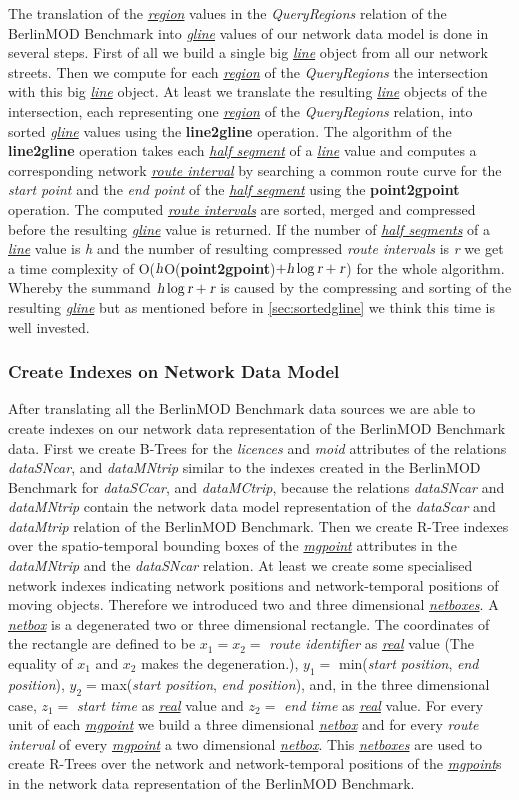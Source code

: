 \documentclass[a4paper]{article}
\newcommand{\bmodb} {BerlinMOD Benchmark}
\newcommand{\op}[1]{\textbf{#1}}
\newcommand{\var}[1]{\textsl{#1}}
\newcommand{\dt}[1]{\textsl{\underline{#1}}}
\begin{document}
{The translation of the \dt{region} values in the \var{QueryRegions} relation of the \bmodb{} into \dt{gline} values of our network data model is done in several steps. First of all we build a single big \dt{line} object from all our network streets. Then we compute for each \dt{region} of the \var{QueryRegions} the intersection with this big \dt{line} object. At least we translate the resulting \dt{line} objects of the intersection, each representing one \dt{region} of the \var{QueryRegions} relation, into sorted \dt{gline} values using the \op{line2gline} operation. The algorithm of the \op{line2gline} operation takes each \dt{half segment} of a \dt{line} value and computes a corresponding network \dt{route interval} by searching a common route curve for the \var{start point} and the \var{end point} of the \dt{half segment} using the \op{point2gpoint} operation. The computed \dt{route intervals} are sorted, merged and compressed before the resulting \dt{gline} value is returned. If the number of \dt{half segments} of a \dt{line} value is \var{h} and the number of resulting compressed \var{route intervals} is \var{r} we get a time complexity of  O($\var{h}$O(\op{point2gpoint})$+ \var{h} \log \var{r} + \var{r}$) for the whole algorithm. Whereby the summand $\var{h} \log \var{r} + \var{r}$ is caused by the compressing and sorting of the resulting \dt{gline} but as mentioned before in \ref{sec:sortedgline} we think this time is well invested.
\subsubsection{Create Indexes on Network Data Model}
\label{sec:createIndex}
After translating all the \bmodb{} data sources we are able to create indexes on our network data representation of the \bmodb{} data. First we create B-Trees for the \var{licences} and \var{moid} attributes of the relations \var{dataSNcar}, and \var{dataMNtrip} similar to the indexes created in the \bmodb{} for \var{dataSCcar}, and \var{dataMCtrip}, because the relations \var{dataSNcar} and \var{dataMNtrip} contain the network data model representation of the \var{dataScar} and \var{dataMtrip} relation of the \bmodb{}. Then we create R-Tree indexes over the spatio-temporal bounding boxes of the \dt{mgpoint} attributes in the \var{dataMNtrip} and the \var{dataSNcar} relation. At least we create some specialised network indexes indicating network positions and network-temporal positions of moving objects. Therefore we introduced two and three dimensional \dt{netboxes}. A \dt{netbox} is a degenerated two or three dimensional rectangle. The coordinates of the rectangle are defined to be $x_1 = x_2 = $ \var{route identifier} as \dt{real} value (The equality of $x_1$ and $x_2$ makes the degeneration.), $y_1 = $ min(\var{start position}, \var{end position}), $y_2 = $max(\var{start position}, \var{end position}), and, in the three dimensional case, $z_1 =$  \var{start time} as \dt{real} value and $z_2 = $ \var{end time} as \dt{real} value.  For every unit of each \dt{mgpoint} we build a three dimensional \dt{netbox} and for every \var{route interval} of every \dt{mgpoint} a two dimensional \dt{netbox}. This \dt{netboxes} are used to create R-Trees over the network and network-temporal positions of the \dt{mgpoint}s in the network data representation of the \bmodb{}.
}
\end{document}

